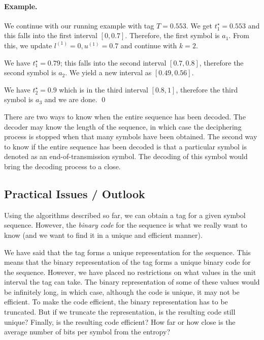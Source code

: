 \paragraph{Example.} We continue with our running example with tag $T = 0.553$. We get $t_1^\star = 0.553$ and this falls into the first interval $[0, 0.7]$. Therefore, the first symbol is $a_1$. From this, we update $l^{(1)} = 0, u^{(1)} = 0.7$ and continue with $k=2$.

We have $t_1^\star = 0.79$; this falls into the second interval $[0.7, 0.8]$, therefore the second symbol is $a_2$. We yield a new interval as $[0.49, 0.56]$.

We have $t_2^\star = 0.9$ which is in the third interval $[0.8, 1]$, therefore the third symbol is $a_3$ and we are done. \qed

There are two ways to know when the entire sequence has been decoded. The decoder may know the length of the sequence, in which case the deciphering process is stopped when that many symbols have been obtained. The second way to know if the entire sequence has been decoded is that a particular symbol is denoted as an  end-of-transmission symbol. The decoding of this symbol would bring the decoding process to a close.

\subsection{Practical Issues / Outlook}

Using the algorithms described so far, we can obtain a tag for a given symbol sequence. However, the \emph{binary code} for the sequence is what we really want to know (and we want to find it in a unique and efficient manner). 

We have said that the tag forms a unique representation for the sequence. This means that the binary representation of the tag forms a unique binary code for the sequence. However, we have placed no restrictions on what values in the unit interval the tag can take. The binary representation of some of these values would be infinitely long, in which case, although the code is unique, it may not be efficient. To make the code efficient, the binary representation has to be truncated. But if we truncate the representation, is the resulting code still unique? Finally, is the resulting code efficient? How far or how close is the average number of bits per symbol from the entropy?

